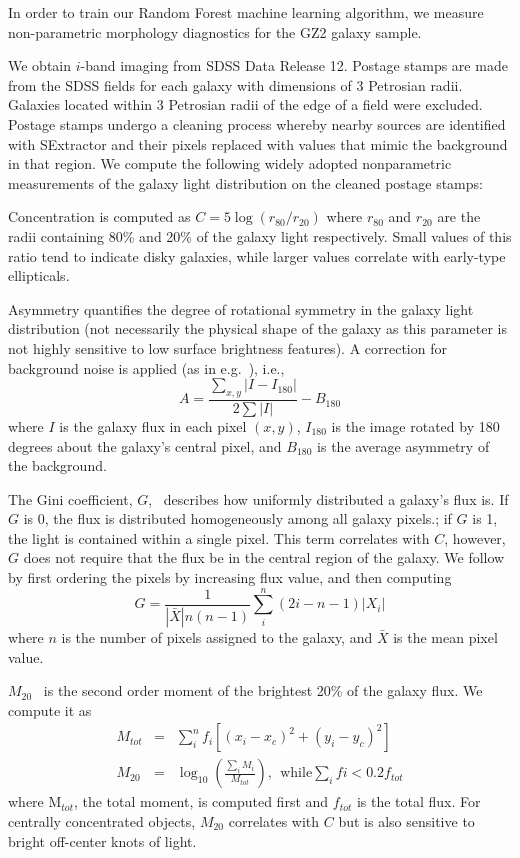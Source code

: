 \documentclass[twocolumn]{aastex6}
\newcommand{\rr}[1]{$r_{#1}$}
\newcommand{\M}[1]{$M_{\mathrm{#1}}$}
\begin{document}
In order to train our Random Forest machine learning algorithm, we measure  non-parametric
morphology diagnostics for the GZ2 galaxy sample. 

We obtain $i$-band imaging from SDSS Data Release 12. Postage stamps are made from the SDSS fields for each galaxy with dimensions of 3 Petrosian radii. Galaxies located within 3 Petrosian radii of the edge of a field were excluded.  Postage stamps undergo a cleaning process whereby nearby sources are identified with SExtractor \citep[ver. 2.8.6;][]{sextractor} and their pixels replaced with values that mimic the background in that region. We compute the following widely adopted nonparametric measurements  of the galaxy light distribution on the cleaned postage stamps:


Concentration is computed as $C = 5\log(r_{80}/ r_{20})$ where \rr{80} and \rr{20} are the radii containing 80\% and 20\% of the galaxy light respectively.  Small values of this ratio tend to indicate disky galaxies, while larger values correlate with early-type ellipticals. 

Asymmetry quantifies the degree of rotational symmetry in the galaxy light distribution (not necessarily the physical shape of the galaxy as this parameter is not highly sensitive to low surface brightness features). A correction for background noise is applied (as in e.g.~\cite{Conselice2000}), i.e., 
\begin{equation}
A = \frac{\sum_{x,y} |I - I_{180}|}{ 2\sum|I|} - B_{180}
\end{equation}
where $I$ is the galaxy flux in each pixel $(x, y)$, $I_{180}$ is the image rotated by 180 degrees about the galaxy's central pixel, and $B_{180}$ is the average asymmetry of the background. 

The Gini coefficient, $G$,~\citep{Glasser1962, Abraham2003} describes how uniformly distributed a galaxy's flux is.  If $G$ is 0, the flux is distributed homogeneously among all galaxy pixels.; if $G$ is 1,  the light is contained within a single pixel. This term correlates with $C$, however, $G$ does not require that the flux be in the central region of the galaxy.  We follow~\cite{Lotz2004} by first ordering the pixels by increasing flux value, and then computing
\begin{equation}
G = \frac{1}{|\bar X|n(n-1)}\sum_i^n(2i-n-1)|X_i|
\end{equation}
where $n$ is the number of pixels assigned to the galaxy, and $\bar X$ is the mean pixel value. 

\M{20}~\citep{Lotz2004} is the second order moment of the brightest 20\% of the galaxy flux. We compute it as
\begin{eqnarray}
 M_{tot} & = & \sum_i^nf_i[(x_i-x_c)^2 + (y_i-y_c)^2]  \\
 M_{20} & = & \log_{10} (\frac{\sum_iM_i}{M_{tot}}), ~~\textrm{while} \sum_ifi < 0.2f_{tot}
\end{eqnarray}
where M$_{tot}$, the total moment, is computed first and $f_{tot}$ is the total flux. For centrally concentrated objects, \M{20} correlates with $C$ but is also sensitive to bright off-center knots of light. 
\end{document}
